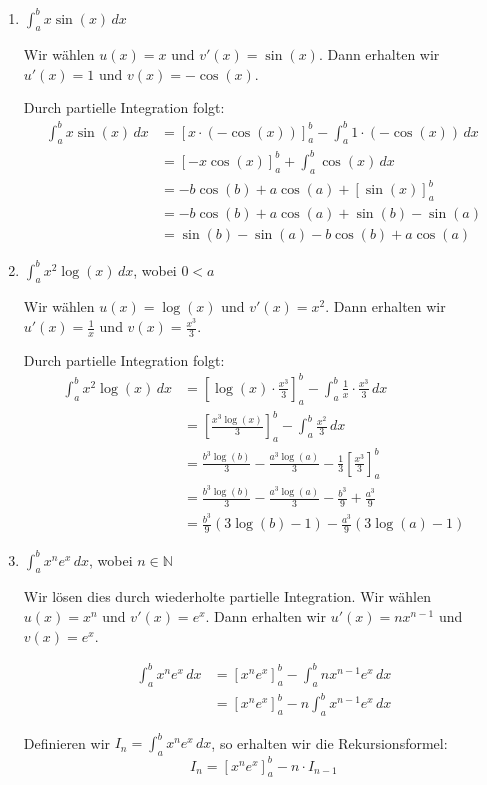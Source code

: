 \documentclass{article}
\begin{document}
\begin{enumerate}
\item $\int_a^b x\sin(x)\,dx$

Wir wählen $u(x) = x$ und $v'(x) = \sin(x)$. Dann erhalten wir $u'(x) = 1$ und $v(x) = -\cos(x)$.

Durch partielle Integration folgt:
\begin{align}
\int_a^b x\sin(x)\,dx &= [x \cdot (-\cos(x))]_a^b - \int_a^b 1 \cdot (-\cos(x))\,dx\\
&= [-x\cos(x)]_a^b + \int_a^b \cos(x)\,dx\\
&= -b\cos(b) + a\cos(a) + [\sin(x)]_a^b\\
&= -b\cos(b) + a\cos(a) + \sin(b) - \sin(a)\\
&= \sin(b) - \sin(a) - b\cos(b) + a\cos(a)
\end{align}

\item $\int_a^b x^2\log(x)\,dx$, wobei $0<a$

Wir wählen $u(x) = \log(x)$ und $v'(x) = x^2$. Dann erhalten wir $u'(x) = \frac{1}{x}$ und $v(x) = \frac{x^3}{3}$.

Durch partielle Integration folgt:
\begin{align}
\int_a^b x^2\log(x)\,dx &= \left[\log(x) \cdot \frac{x^3}{3}\right]_a^b - \int_a^b \frac{1}{x} \cdot \frac{x^3}{3}\,dx\\
&= \left[\frac{x^3\log(x)}{3}\right]_a^b - \int_a^b \frac{x^2}{3}\,dx\\
&= \frac{b^3\log(b)}{3} - \frac{a^3\log(a)}{3} - \frac{1}{3}\left[\frac{x^3}{3}\right]_a^b\\
&= \frac{b^3\log(b)}{3} - \frac{a^3\log(a)}{3} - \frac{b^3}{9} + \frac{a^3}{9}\\
&= \frac{b^3}{9}(3\log(b) - 1) - \frac{a^3}{9}(3\log(a) - 1)
\end{align}

\item $\int_a^b x^n e^x\,dx$, wobei $n\in\mathbb{N}$

Wir lösen dies durch wiederholte partielle Integration. Wir wählen $u(x) = x^n$ und $v'(x) = e^x$. 
Dann erhalten wir $u'(x) = nx^{n-1}$ und $v(x) = e^x$.

\begin{align}
\int_a^b x^n e^x\,dx &= [x^n e^x]_a^b - \int_a^b nx^{n-1} e^x\,dx\\
&= [x^n e^x]_a^b - n\int_a^b x^{n-1} e^x\,dx
\end{align}

Definieren wir $I_n = \int_a^b x^n e^x\,dx$, so erhalten wir die Rekursionsformel:
$$I_n = [x^n e^x]_a^b - n \cdot I_{n-1}$$


\end{enumerate}
\end{document}
